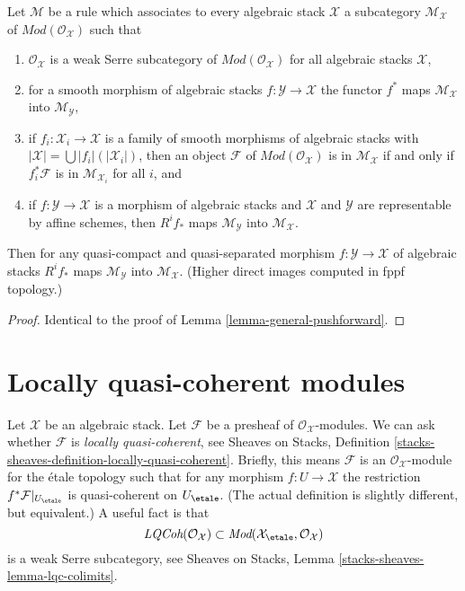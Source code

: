 \begin{lemma}
\label{lemma-general-pushforward-fppf}
Let $\mathcal{M}$ be a rule which associates to every algebraic stack
$\mathcal{X}$ a subcategory $\mathcal{M}_\mathcal{X}$ of
$\textit{Mod}(\mathcal{O}_\mathcal{X})$
such that
\begin{enumerate}
\item $\mathcal{O}_\mathcal{X}$ is a weak Serre subcategory
of $\textit{Mod}(\mathcal{O}_\mathcal{X})$
for all algebraic stacks $\mathcal{X}$,
\item for a smooth morphism of algebraic stacks
$f : \mathcal{Y} \to \mathcal{X}$ the functor $f^*$ maps
$\mathcal{M}_\mathcal{X}$ into $\mathcal{M}_\mathcal{Y}$,
\item if $f_i : \mathcal{X}_i \to \mathcal{X}$ is a family of smooth
morphisms of algebraic stacks with
$|\mathcal{X}| = \bigcup |f_i|(|\mathcal{X}_i|)$, then an object
$\mathcal{F}$ of $\textit{Mod}(\mathcal{O}_\mathcal{X})$
is in $\mathcal{M}_\mathcal{X}$ if and only if
$f_i^*\mathcal{F}$ is in $\mathcal{M}_{\mathcal{X}_i}$ for all $i$, and
\item if $f : \mathcal{Y} \to \mathcal{X}$ is a morphism of algebraic
stacks and $\mathcal{X}$ and $\mathcal{Y}$ are representable
by affine schemes, then $R^if_*$ maps $\mathcal{M}_\mathcal{Y}$
into $\mathcal{M}_\mathcal{X}$.
\end{enumerate}
Then for any quasi-compact and quasi-separated morphism 
$f : \mathcal{Y} \to \mathcal{X}$ of algebraic stacks
$R^if_*$ maps $\mathcal{M}_\mathcal{Y}$
into $\mathcal{M}_\mathcal{X}$. (Higher direct images computed in fppf
topology.)
\end{lemma}

\begin{proof}
Identical to the proof of Lemma \ref{lemma-general-pushforward}.
\end{proof}


\section{Locally quasi-coherent modules}
\label{section-locally-quasi-coherent}

\noindent
Let $\mathcal{X}$ be an algebraic stack. Let $\mathcal{F}$ be a presheaf
of $\mathcal{O}_\mathcal{X}$-modules. We can ask whether $\mathcal{F}$
is {\it locally quasi-coherent}, see
Sheaves on Stacks, Definition
\ref{stacks-sheaves-definition-locally-quasi-coherent}.
Briefly, this means $\mathcal{F}$ is an $\mathcal{O}_\mathcal{X}$-module
for the \'etale topology such that for any morphism $f : U \to \mathcal{X}$
the restriction $f^*\mathcal{F}|_{U_\etale}$ is quasi-coherent
on $U_\etale$. (The actual definition is slightly different, but
equivalent.) A useful fact is that
$$
\textit{LQCoh}(\mathcal{O}_\mathcal{X}) \subset
\textit{Mod}(\mathcal{X}_\etale, \mathcal{O}_\mathcal{X})
$$
is a weak Serre subcategory, see
Sheaves on Stacks, Lemma \ref{stacks-sheaves-lemma-lqc-colimits}.


